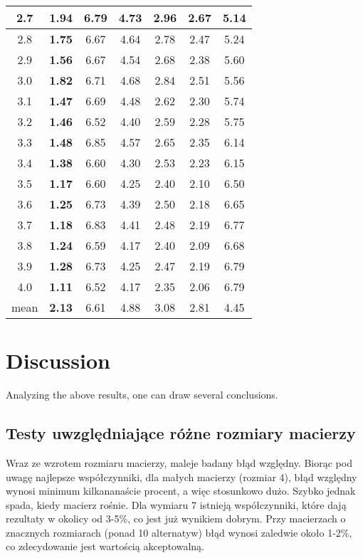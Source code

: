 \begin{table}[!ht]
\begin{center}
\begin{tabular}{|c||c|c|c|c|c|c|}
2.7 & \textbf{1.94} & 6.79 & 4.73 & 2.96 & 2.67 & 5.14 \\ \hline
2.8 & \textbf{1.75} & 6.67 & 4.64 & 2.78 & 2.47 & 5.24 \\ \hline
2.9 & \textbf{1.56} & 6.67 & 4.54 & 2.68 & 2.38 & 5.60 \\ \hline
3.0 & \textbf{1.82} & 6.71 & 4.68 & 2.84 & 2.51 & 5.56 \\ \hline
3.1 & \textbf{1.47} & 6.69 & 4.48 & 2.62 & 2.30 & 5.74 \\ \hline
3.2 & \textbf{1.46} & 6.52 & 4.40 & 2.59 & 2.28 & 5.75 \\ \hline
3.3 & \textbf{1.48} & 6.85 & 4.57 & 2.65 & 2.35 & 6.14 \\ \hline
3.4 & \textbf{1.38} & 6.60 & 4.30 & 2.53 & 2.23 & 6.15 \\ \hline
3.5 & \textbf{1.17} & 6.60 & 4.25 & 2.40 & 2.10 & 6.50 \\ \hline
3.6 & \textbf{1.25} & 6.73 & 4.39 & 2.50 & 2.18 & 6.65 \\ \hline
3.7 & \textbf{1.18} & 6.83 & 4.41 & 2.48 & 2.19 & 6.77 \\ \hline
3.8 & \textbf{1.24} & 6.59 & 4.17 & 2.40 & 2.09 & 6.68 \\ \hline
3.9 & \textbf{1.28} & 6.73 & 4.25 & 2.47 & 2.19 & 6.79 \\ \hline
4.0 & \textbf{1.11} & 6.52 & 4.17 & 2.35 & 2.06 & 6.79 \\ \hline \hline
mean & \textbf{2.13} & 6.61 & 4.88 & 3.08 & 2.81 & 4.45 \\ \hline 
\end{tabular}
\end{center}
\end{table}

\section{Discussion}
Analyzing the above results, one can draw several conclusions.

\subsection{Testy uwzględniające różne rozmiary macierzy}
Wraz ze wzrotem rozmiaru macierzy, maleje badany błąd względny. Biorąc pod uwagę najlepsze współczynniki, dla małych macierzy (rozmiar 4), błąd względny wynosi minimum kilkananaście procent, a więc stosunkowo dużo. Szybko jednak spada, kiedy macierz rośnie. Dla wymiaru 7 istnieją współczynniki, które dają rezultaty w okolicy od 3-5\%, co jest już wynikiem dobrym. Przy macierzach o znacznych rozmiarach (ponad 10 alternatyw) błąd wynosi zaledwie około 1-2\%, co zdecydowanie jest wartością akceptowalną. 

